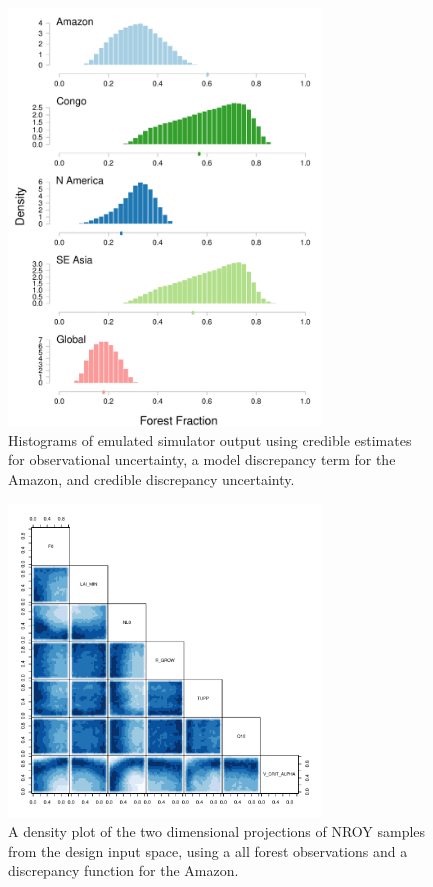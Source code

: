 \documentclass[esd, article]{copernicus} %
\begin{document}
\begin{figure}[t]
\includegraphics[width=8.3cm]{graphics/credible_NROY_hists_disc.pdf}
\caption{Histograms of emulated simulator output using credible estimates for observational uncertainty, a model discrepancy term for the Amazon, and credible discrepancy uncertainty.}
\label{fig:credible_NROY_hists_disc}
\end{figure}

\begin{figure}[t]
\includegraphics[width=8.3cm]{graphics/plausible_disc_input_space.pdf}
\caption{A density plot of the two dimensional projections of NROY samples from the design input space, using a all forest observations and a discrepancy function for the Amazon.}
\label{fig:plausible_disc_input_space}
\end{figure}
\end{document}
